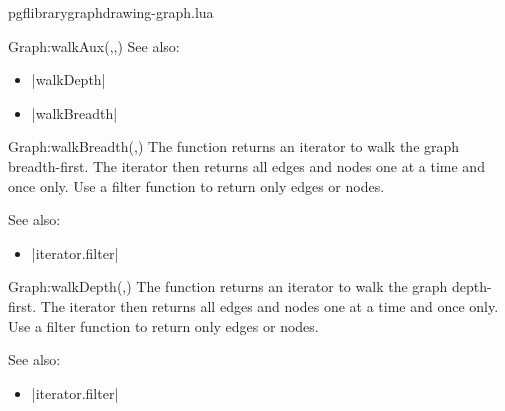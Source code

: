 \begin{filedescription}{pgflibrarygraphdrawing-graph.lua}
\begin{luacommand}{{Graph:walkAux}(,,)}
See also:
\begin{itemize}
	\item[] |walkDepth|\item[] |walkBreadth|
\end{itemize}

\end{luacommand}\begin{luacommand}{{Graph:walkBreadth}(,)}
The function returns an iterator to walk the graph breadth-first. The iterator then returns all edges and nodes one at a time and once only.  Use a filter function to return only edges or nodes.



See also:
\begin{itemize}
	\item[] |iterator.filter|
\end{itemize}

\end{luacommand}\begin{luacommand}{{Graph:walkDepth}(,)}
The function returns an iterator to walk the graph depth-first. The iterator then returns all edges and nodes one at a time and once only.  Use a filter function to return only edges or nodes.



See also:
\begin{itemize}
	\item[] |iterator.filter|
\end{itemize}

\end{luacommand}
\end{filedescription}